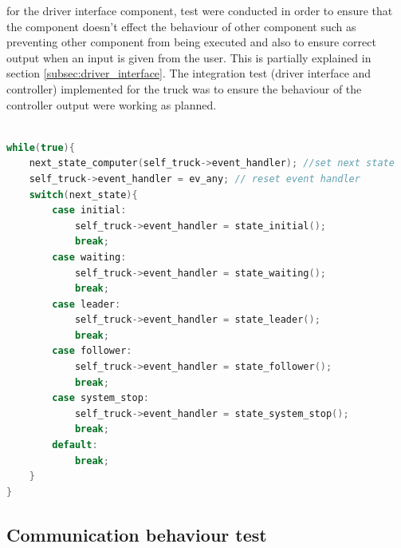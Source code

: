 for the driver interface component, test were conducted in order to ensure that the component doesn't effect the behaviour of other component such as preventing other component from being executed and also to ensure correct output when an input is given from the user. This is partially explained in section \ref{subsec:driver_interface}.
The integration test (driver interface and controller) implemented for the truck was to ensure the behaviour of the controller output  were working as planned. 







\begin{lstlisting}[language=c++, caption=Main process of a controller. Realization of controller state machine , label=code:code_satemachine]

while(true){
    next_state_computer(self_truck->event_handler); //set next state
    self_truck->event_handler = ev_any; // reset event handler
    switch(next_state){
        case initial:
            self_truck->event_handler = state_initial();
            break;
        case waiting:
            self_truck->event_handler = state_waiting();
            break;
        case leader:
            self_truck->event_handler = state_leader();
            break;
        case follower:
            self_truck->event_handler = state_follower();
            break;
        case system_stop:
            self_truck->event_handler = state_system_stop();
            break;
        default:
            break;
    }
}
\end{lstlisting}


\subsection{Communication behaviour test}
\label{subsec:communication_behaviour_test} 

